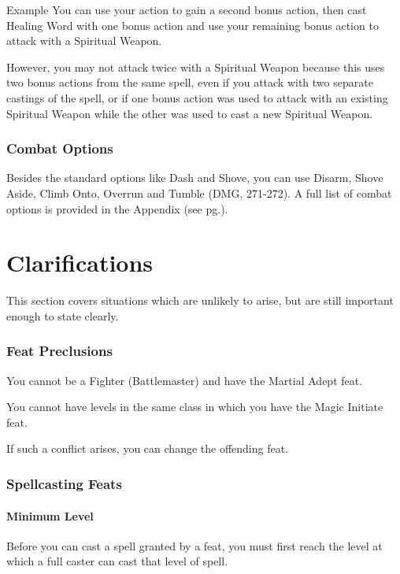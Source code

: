 \documentclass[letterpaper,twocolumn,openany,nodeprecatedcode]{dndbook}
\newcommand{\pg}[1]{pg.\pageref{#1}}
\newcommand{\see}[1]{(see \pg{#1})}
\begin{document}
\begin{DndComment}{Example}
You can use your action to gain a second bonus action, then cast Healing Word with one bonus action and use your remaining bonus action to attack with a Spiritual Weapon. 

However, you may not attack twice with a Spiritual Weapon because this uses two bonus actions from the same spell, even if you attack with two separate castings of the spell, or if one bonus action was used to attack with an existing Spiritual Weapon while the other was used to cast a new Spiritual Weapon.
\end{DndComment}

\subsection{Combat Options}
Besides the standard options like Dash and Shove, you can use Disarm, Shove Aside, Climb Onto, Overrun and Tumble (DMG, 271-272). A full list of combat options is provided in the Appendix \see{combat-options}.















\chapter{Clarifications}

This section covers situations which are unlikely to arise, but are still important enough to state clearly.

\subsection{Feat Preclusions}
You cannot be a Fighter (Battlemaster) and have the Martial Adept feat.

You cannot have levels in the same class in which you have the Magic Initiate feat.

If such a conflict arises, you can change the offending feat.

\subsection{Spellcasting Feats}

\subsubsection{Minimum Level}
Before you can cast a spell granted by a feat, you must first reach the level at which a full caster can cast that level of spell.
\end{document}
